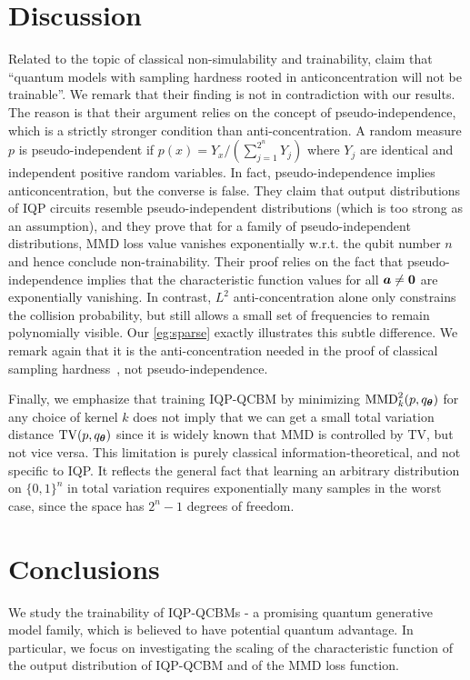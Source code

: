 \documentclass[10pt, twocolumn, a4paper]{article}
\theoremstyle{plain}
\theoremstyle{definition}
\theoremstyle{remark}
\newcommand{\MMD}{\ensuremath{\mathrm{MMD}}\xspace}
\begin{document}
\section{Discussion}
\label{sec:discussion}
Related to the topic of classical non-simulability and trainability, \citet{herbst25} claim that ``quantum models with sampling hardness rooted in anticoncentration will not be trainable''. We remark that their finding is not in contradiction with our results. The reason is that their argument relies on the concept of pseudo-independence, which is a strictly stronger condition than anti-concentration. A random measure $p$ is pseudo-independent if $p(x)=Y_x / (\sum_{j=1}^{2^n} Y_j)$ where $Y_j$ are identical and independent positive random variables. In fact, pseudo-independence implies anticoncentration, but the converse is false. They claim that output distributions of IQP circuits resemble pseudo-independent distributions (which is too strong as an assumption), and they prove that for a family of pseudo-independent distributions, MMD loss value vanishes exponentially w.r.t. the qubit number $n$ and hence conclude non-trainability. Their proof relies on the fact that pseudo-independence implies that the characteristic function values for all ${\bm{a}} \neq \bm{0}$ are exponentially vanishing. In contrast, $L^2$ anti-concentration alone only constrains the collision probability, but still allows a small set of frequencies to remain polynomially visible. Our \cref{eg:sparse} exactly illustrates this subtle difference. We remark again that it is the anti-concentration needed in the proof of classical sampling hardness~\cite{Bremner16, Bremner17}, not pseudo-independence. 

Finally, we emphasize that training IQP-QCBM by minimizing $\MMD_k^2(p, q_\vttheta)$ for any choice of kernel $k$ does not imply that we can get a small total variation distance $\operatorname{TV}(p, q_{\bm{\theta}})$ since it is widely known that MMD is controlled by TV, but not vice versa. This limitation is purely classical information-theoretical, and not specific to IQP. It reflects the general fact that learning an arbitrary distribution on $\{0,1\}^n$ in total variation requires exponentially many samples in the worst case, since the space has $2^n-1$ degrees of freedom. 


\section{Conclusions}
\label{sec:conclusion}
We study the trainability of IQP-QCBMs - a promising quantum generative model family, which is believed to have potential quantum advantage. In particular, we focus on investigating the scaling of the characteristic function of the output distribution of IQP-QCBM and of the MMD loss function.
\end{document}
